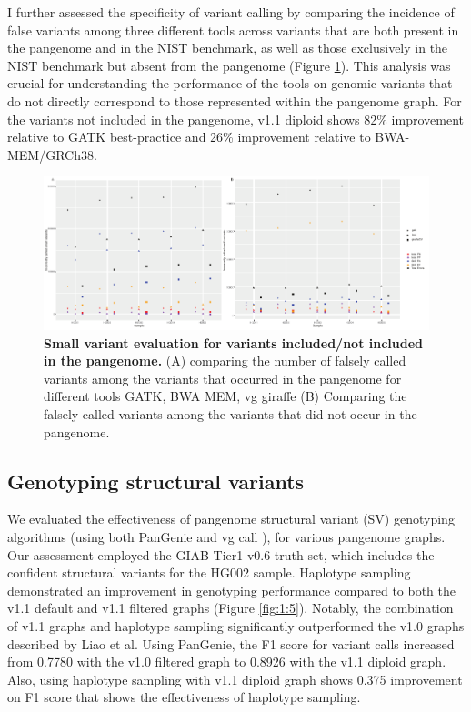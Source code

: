 \documentclass[11pt]{ucthesis}
\begin{document}
I further assessed the specificity of variant calling by comparing the incidence of false variants among three different tools across variants that are both present in the pangenome and in the NIST benchmark, as well as those exclusively in the NIST benchmark but absent from the pangenome (Figure \ref{fig:1:4}).
This analysis was crucial for understanding the performance of the tools on genomic variants that do not directly correspond to those represented within the pangenome graph. For the variants not included in the pangenome, v1.1 diploid shows 82\% improvement relative to GATK best-practice and 26\% improvement relative to BWA-MEM/GRCh38.

\begin{figure}[h]
    \centering
    \includegraphics[width=\linewidth]{Images/in_out_pangenome (3).pdf}
        \caption[Small variant evaluation for variants included/not included in the pangenome]{\textbf{Small variant evaluation for variants included/not included in the pangenome.} (A) comparing the number of falsely called variants among the variants that occurred in the pangenome for different tools GATK, BWA MEM, vg giraffe (B) Comparing the falsely called variants among the variants that did not occur in the pangenome.}
    \label{fig:1:4}
\end{figure}


\subsection{Genotyping structural variants}
We evaluated the effectiveness of pangenome structural variant (SV) genotyping algorithms (using both PanGenie \cite{ebler2022pangenome} and vg call \cite{hickey2020genotyping}), for various pangenome graphs. Our assessment employed the GIAB Tier1 v0.6 truth set, which includes the confident structural variants for the HG002 sample. Haplotype sampling demonstrated an improvement in genotyping performance compared to both the v1.1 default and v1.1 filtered graphs (Figure \ref{fig:1:5}). Notably, the combination of v1.1 graphs and haplotype sampling significantly outperformed the v1.0 graphs described by Liao et al. Using PanGenie, the F1 score for variant calls increased from 0.7780 with the v1.0 filtered graph to 0.8926 with the v1.1 diploid graph. Also, using haplotype sampling with v1.1 diploid graph shows 0.375 improvement on F1 score that shows the effectiveness of haplotype sampling.  
\end{document}
